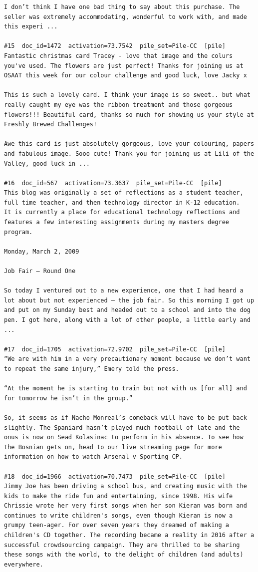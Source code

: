 \begin{verbatim}
I don’t think I have one bad thing to say about this purchase. The seller was extremely accommodating, wonderful to work with, and made this experi ...

#15  doc_id=1472  activation=73.7542  pile_set=Pile-CC  [pile]
Fantastic christmas card Tracey - love that image and the colurs you've used. The flowers are just perfect! Thanks for joining us at OSAAT this week for our colour challenge and good luck, love Jacky x

This is such a lovely card. I think your image is so sweet.. but what really caught my eye was the ribbon treatment and those gorgeous flowers!!! Beautiful card, thanks so much for showing us your style at Freshly Brewed Challenges!

Awe this card is just absolutely gorgeous, love your colouring, papers and fabulous image. Sooo cute! Thank you for joining us at Lili of the Valley, good luck in ...

#16  doc_id=567  activation=73.3637  pile_set=Pile-CC  [pile]
This blog was originally a set of reflections as a student teacher, full time teacher, and then technology director in K-12 education.
It is currently a place for educational technology reflections and features a few interesting assignments during my masters degree program.

Monday, March 2, 2009

Job Fair – Round One

So today I ventured out to a new experience, one that I had heard a lot about but not experienced – the job fair. So this morning I got up and put on my Sunday best and headed out to a school and into the dog pen. I got here, along with a lot of other people, a little early and ...

#17  doc_id=1705  activation=72.9702  pile_set=Pile-CC  [pile]
“We are with him in a very precautionary moment because we don’t want to repeat the same injury,” Emery told the press.

“At the moment he is starting to train but not with us [for all] and for tomorrow he isn’t in the group.”

So, it seems as if Nacho Monreal’s comeback will have to be put back slightly. The Spaniard hasn’t played much football of late and the onus is now on Sead Kolasinac to perform in his absence. To see how the Bosnian gets on, head to our live streaming page for more information on how to watch Arsenal v Sporting CP.

#18  doc_id=1966  activation=70.7473  pile_set=Pile-CC  [pile]
Jimmy Joe has been driving a school bus, and creating music with the kids to make the ride fun and entertaining, since 1998. His wife Chrissie wrote her very first songs when her son Kieran was born and continues to write children's songs, even though Kieran is now a grumpy teen-ager. For over seven years they dreamed of making a children's CD together. The recording became a reality in 2016 after a successful crowdsourcing campaign. They are thrilled to be sharing these songs with the world, to the delight of children (and adults) everywhere.


\end{verbatim}
